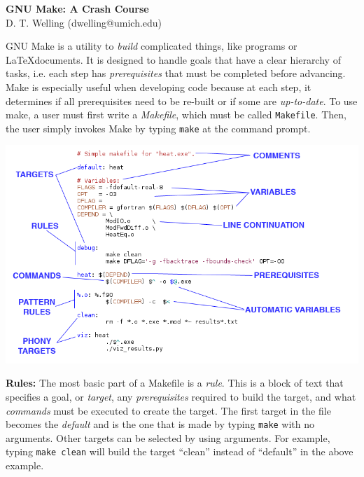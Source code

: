 \documentclass[12pt, letterpaper]{article}
\begin{document}
\begin{center}
  {\LARGE \textbf{GNU Make: A Crash Course}}\\
  D. T. Welling (dwelling@umich.edu)
\end{center}

GNU Make is a utility to \emph{build} complicated things, like programs or
\LaTeX documents.  It is designed to handle goals that have a clear
hierarchy of tasks, i.e. each step has \emph{prerequisites} that must be
completed before advancing.  Make is especially useful when developing code
because at each step, it determines if all prerequisites need to be re-built
or if some are \emph{up-to-date}.  To use make, a user must first write a
\emph{Makefile}, which must be called {\tt Makefile}.  
Then, the user simply invokes Make by typing {\tt make} at the command prompt.

\begin{center}
  \includegraphics[width=6.5in]{make_diagram.png}
\end{center}

\noindent \textbf{Rules:} The most basic part of a Makefile is a \emph{rule}.
This is a block of text that specifies a goal, or \emph{target}, any 
\emph{prerequisites} required to build the target, and what 
\emph{commands} must be executed to create the target.  The first
target in the file becomes the \emph{default} and is the one that is made
by typing {\tt make} with no arguments.  Other targets can be selected by
using arguments.  For example, typing {\tt make clean} will build the 
target ``clean'' instead of ``default'' in the above example.

\vspace{0.5cm}
\end{document}
